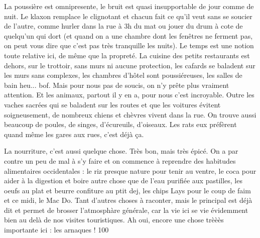 \begin{multicols}{2}
La poussière est omnipresente, le bruit est quasi insupportable de jour comme de nuit. Le klaxon remplace le clignotant et chacun fait ce qu'il veut sans se soucier de l'autre, comme hurler dans la rue à 3h du mat ou jouer du drum à cote de quelqu'un qui dort (et quand on a une chambre dont les fenêtres ne ferment pas, on peut vous dire que c'est pas très tranquille les nuits). Le temps est une notion toute relative ici, de même que la propreté. La cuisine des petits restaurants est dehors, sur le trottoir, sans murs ni aucune protection, les cafards se baladent sur les murs sans complexes, les chambres d'hôtel sont poussiéreuses, les salles de bain heu... bof. Mais pour nous pas de soucis, on n'y prête plus vraiment attention. Et les animaux, partout il y en a, pour nous c'est incroyable. Outre les vaches sacrées qui se baladent sur les routes et que les voitures évitent soigneusement, de nombreux chiens et chèvres vivent dans la rue. On trouve aussi beaucoup de poules, de singes, d'écureuils, d'oiseaux. Les rats eux préfèrent quand même les gares aux rues, c'est déjà ça.

La nourriture, c'est aussi quelque chose. Très bon, mais très épicé. On a par contre un peu de mal à s'y faire et on commence à reprendre des habitudes alimentaires occidentales : le riz presque nature pour tenir au ventre, le coca pour aider à la digestion et boire autre chose que de l'eau purifiée aux pastilles, les oeufs au plat et beurre confiture au ptit dej, les chips Lays pour le coup de faim et ce midi, le Mac Do. Tant d'autres choses à raconter, mais le principal est déjà dit et permet de brosser l'atmosphàre générale, car la vie ici se vie évidemment bien au delà de nos visites touristiques. Ah oui, encore une chose trèèès importante ici : les arnaques ! 100%


\end{multicols}

